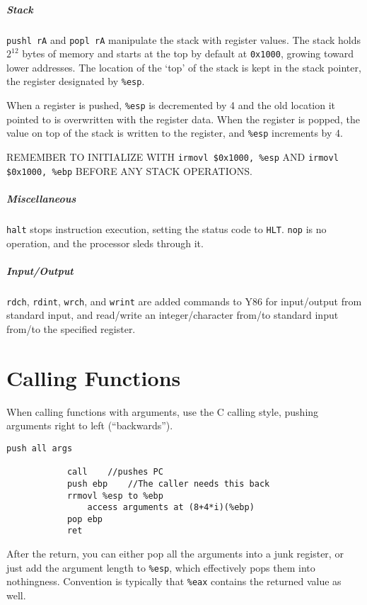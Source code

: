 \documentclass[11pt]{article}
\begin{document}
	\subparagraph{Stack} \verb|pushl rA| and \verb|popl rA| manipulate the stack with register values. The stack holds $2^{12}$ bytes of memory and starts at the top by default at \verb|0x1000|, growing toward lower addresses. The location of the `top' of the stack is kept in the stack pointer, the register designated by \verb|%esp|. 
	
	When a register is pushed, \verb|%esp| is decremented by 4 and the old location it pointed to is overwritten with the register data. When the register is popped, the value on top of the stack is written to the register, and \verb|%esp| increments by 4. 
	
	REMEMBER TO INITIALIZE WITH \verb|irmovl $0x1000, %esp| AND \verb|irmovl $0x1000, %ebp| BEFORE ANY STACK OPERATIONS.
	
	\subparagraph{Miscellaneous} \verb|halt| stops instruction execution, setting the status code to \verb|HLT|. \verb|nop| is no operation, and the processor sleds through it.
	
	\subparagraph{Input/Output} \verb|rdch|, \verb|rdint|, \verb|wrch|, and \verb|wrint| are added commands to Y86 for input/output from standard input, and read/write an integer/character from/to standard input from/to the specified register.
	
\section{Calling Functions}
	When calling functions with arguments, use the C calling style, pushing
	arguments right to left (``backwards'').

	\begin{lstlisting}[autogobble=true]
			push all args
			
			call	//pushes PC
			push ebp	//The caller needs this back
			rrmovl %esp to %ebp
				access arguments at (8+4*i)(%ebp)
			pop ebp
			ret
	\end{lstlisting}

	After the return, you can either pop all the arguments into a junk register, or just add the argument length to \verb|%esp|, which effectively pops them into nothingness. Convention is typically that \verb|%eax| contains the returned value as well.

%		
%		


\end{document}
